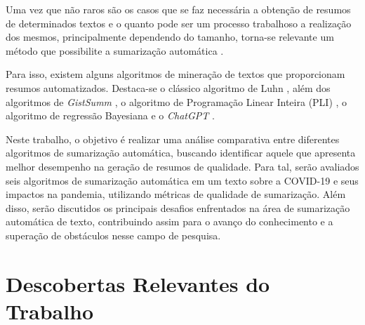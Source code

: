 Uma vez que não raros são os casos que se faz necessária a obtenção de resumos de determinados textos e o quanto pode ser um processo trabalhoso a realização dos mesmos, principalmente dependendo do tamanho, torna-se relevante um método que possibilite a sumarização automática \cite{barbieri2021sumarizaccao}. 

Para isso, existem alguns algoritmos de mineração de textos que proporcionam resumos automatizados. Destaca-se o clássico algoritmo de Luhn \cite{luhn1957stoical}, além dos algoritmos de \textit{GistSumm} \cite{muller2015comparativo}, o algoritmo de Programação Linear Inteira (PLI) \cite{oliveira2018sumarizaccao}, o algoritmo de regressão Bayesiana \cite{sodre2019avaliando} e o \textit{ChatGPT} \cite{rudolph2023chatgpt}.

Neste trabalho, o objetivo é realizar uma análise comparativa entre diferentes algoritmos de sumarização automática, buscando identificar aquele que apresenta melhor desempenho na geração de resumos de qualidade. Para tal, serão avaliados seis algoritmos de sumarização automática em um texto sobre a COVID-19 e seus impactos na pandemia, utilizando métricas de qualidade de sumarização. Além disso, serão discutidos os principais desafios enfrentados na área de sumarização automática de texto, contribuindo assim para o avanço do conhecimento e a superação de obstáculos nesse campo de pesquisa.


\section{Descobertas Relevantes do Trabalho}
\label{sec:descobertas-relevantes}

